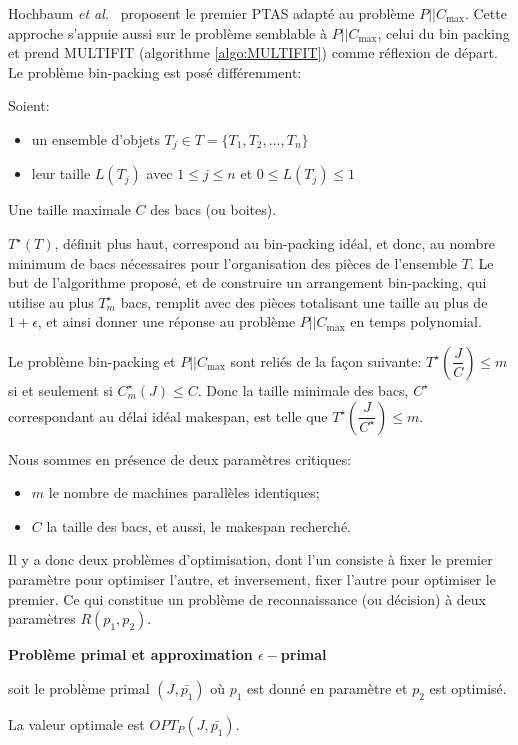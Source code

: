 \documentclass[a4paper,12pt]{report}
\theoremstyle{plain}				%
\theoremstyle{definition}				%
\newcommand\problemGrahamP{$P||C_{\max}$\xspace}
\begin{document}
Hochbaum \emph{et al.}\ \cite{hochbaum1987using} proposent le
premier PTAS adapté au problème \problemGrahamP.
Cette approche s'appuie aussi sur le problème semblable à
\problemGrahamP, celui du bin packing et prend MULTIFIT
(algorithme \ref{algo:MULTIFIT}) comme réflexion de départ.
Le problème bin-packing est posé différemment:

Soient:
\begin{itemize}
\item un ensemble d'objets $T_j \in T = \{T_1, T_2, ..., T_n\}$
\item leur taille $L(T_j)$ avec $1 \le j \le n$ et $0 \le L(T_j) \le 1$
\end{itemize}
Une taille maximale $C$ des bacs (ou boites).

$T^{\star}(T)$, définit plus haut, correspond au bin-packing idéal, et donc,
au nombre minimum de bacs nécessaires pour l'organisation des pièces de l'ensemble $T$.
Le but de l'algorithme proposé, et de construire un arrangement bin-packing,
qui utilise au plus $T^{\star}_m$ bacs, remplit
avec des pièces totalisant une taille au plus de $1+ \epsilon$,
et ainsi donner une réponse au problème \problemGrahamP en temps polynomial.

Le problème bin-packing et \problemGrahamP sont reliés de la façon suivante:
$T^{\star}(\dfrac{J}{C}) \le m$ si et seulement si $C^{\star}_m(J) \le C$.
Donc la taille minimale des bacs, $C^{\star}$ correspondant au délai idéal makespan, est telle que $T^{\star}(\dfrac{J}{C^{\star}}) \le m$.

Nous sommes en présence de deux paramètres critiques:
\begin{itemize}
\item $m$ le nombre de machines parallèles identiques;
\item $C$ la taille des bacs, et aussi, le makespan recherché.
\end{itemize}
Il y a donc deux problèmes d'optimisation,
dont l'un consiste à fixer le premier paramètre pour optimiser l'autre,
et inversement, fixer l'autre pour optimiser le premier.
Ce qui constitue un problème de reconnaissance (ou décision) à deux paramètres $R(p_1, p_2)$.

\bigskip

\textbf{Problème primal et approximation $\epsilon-$primal}

soit le problème primal $(J,\bar{p_1})$
où $p_1$ est donné en paramètre et $p_2$ est optimisé.

La valeur optimale est $OPT_P(J,\bar{p_1})$.
\end{document}
